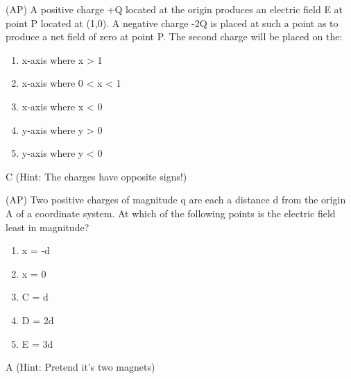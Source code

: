 \begin{question}
(AP) A positive charge +Q located at the origin produces an electric field E at point P located at (1,0). A negative charge -2Q is placed at such a point as to produce a net field of zero at point P. The second charge will be placed on the:
\begin{enumerate}[label=(\alph*)]
    \item x-axis where x > 1
    \item x-axis where 0 < x < 1
    \item x-axis where x < 0
    \item y-axis where y > 0
    \item y-axis where y < 0
\end{enumerate}

\end{question}

\begin{solution}
C (Hint: The charges have opposite signs!)
\end{solution}


\begin{question}
(AP) Two positive charges of magnitude q are each a distance d from the origin A of a coordinate system. At which of the following points is the electric field least in magnitude?
\begin{multicols}{5}
\begin{enumerate}[label=(\alph*)]
    \item x = -d
    \item x = 0
    \item C = d
    \item D = 2d
    \item E = 3d
\end{enumerate}
\end{multicols}

\end{question}

\begin{solution}
A (Hint: Pretend it's two magnets)
\end{solution}



